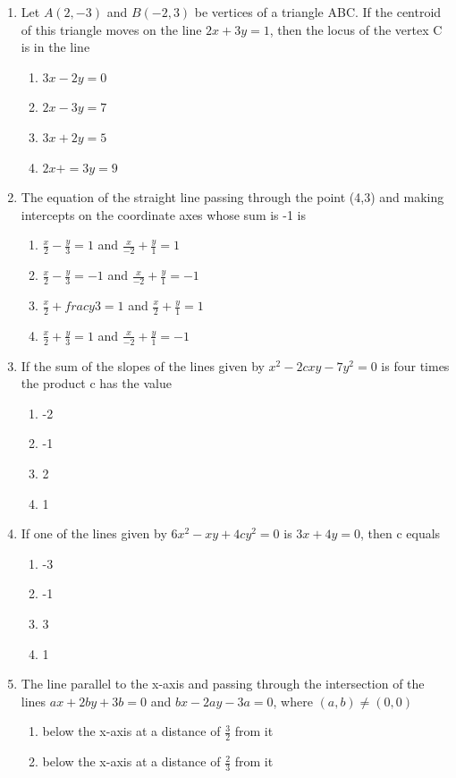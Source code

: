 \documentclass[12pt]{article}
\begin{document}
\begin{enumerate}
\item Let $A(2,-3)$ and $B(-2,3)$ be vertices of a triangle ABC. If the centroid of this triangle moves on the line $2x+3y=1$, then the locus of the vertex C is in the line 
\begin{enumerate}
\item $3x-2y=0$
\item $2x-3y=7$ 
\item $3x+2y=5$ 
\item $2x+=3y=9$
\end{enumerate}
\item The equation of the straight line passing through the point (4,3) and making intercepts on the coordinate axes whose sum is -1 is 
\begin{enumerate}
\item $\frac{x}{2}-\frac{y}{3}=1$ and $\frac{x}{-2}+\frac{y}{1}=1$
\item $\frac{x}{2}-\frac{y}{3}=-1$ and $\frac{x}{-2}+\frac{y}{1}=-1$
\item $\frac{x}{2}+frac{y}{3}=1$ and $\frac{x}{2}+\frac{y}{1}=1$
\item $\frac{x}{2}+\frac{y}{3}=1$ and $\frac{x}{-2}+\frac{y}{1}=-1$
\end{enumerate}
\item If the sum of the slopes of the lines given by $x^2-2cxy-7y^2=0$ is four times the product c has the value
\begin{enumerate}
\item -2 
\item -1 
\item  2 
\item  1
\end{enumerate}
\item If one of the lines given by $6x^2-xy+4cy^2=0$ is $3x+4y=0$, then c equals 
\begin{enumerate}
\item -3 
\item -1 
\item  3 
\item  1
\end{enumerate}
\item The line parallel to the x-axis and passing through the intersection of the lines $ax+2by+3b=0$ and $bx-2ay-3a=0$, where $(a,b) \neq (0,0)$
\begin{enumerate}
\item below the x-axis at a distance of $\frac{3}{2}$ from it
\item below the x-axis at a distance of $\frac{2}{3}$ from it

\end{enumerate}
\end{enumerate}
\end{document}
